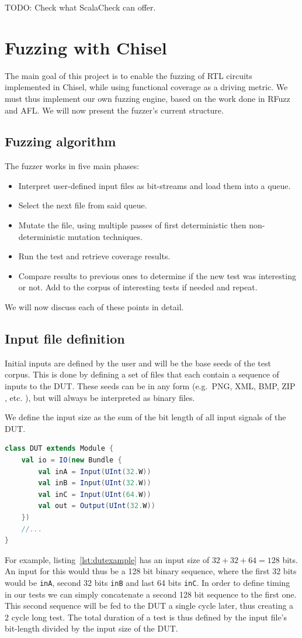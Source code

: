 \documentclass[conference]{IEEEtran}
\newcommand{\todo}[1]{{\color{olive} TODO: #1}}
\begin{document}
\todo{Check what ScalaCheck can offer.}


\section{Fuzzing with Chisel}
The main goal of this project is to enable the fuzzing of RTL circuits implemented in Chisel, while using functional coverage as a driving metric.
We must thus implement our own fuzzing engine, based on the work done in RFuzz and AFL. 
We will now present the fuzzer's current structure.

\subsection{Fuzzing algorithm}  
The fuzzer works in five main phases:  
\begin{itemize}
\item Interpret user-defined input files as bit-streams and load them into a queue.
\item Select the next file from said queue.
\item Mutate the file, using multiple passes of first deterministic then non-deterministic mutation techniques.  
\item Run the test and retrieve coverage results. 
\item Compare results to previous ones to determine if the new test was interesting or not. Add to the corpus of interesting tests if needed and repeat. 
\end{itemize}  

We will now discuss each of these points in detail.  
\subsection{Input file definition} 
Initial inputs are defined by the user and will be the base seeds of the test corpus.
This is done by defining a set of files that each contain a sequence of inputs to the DUT.
These seeds can be in any form (e.g.\ PNG, XML, BMP, ZIP , etc. ), but will always be interpreted as binary files.

We define the input size as the sum of the bit length of all input signals of the DUT.
\begin{lstlisting}[captionpos=b,caption={Basic DUT with two 32 bit inputs, one 64 input, as well as a 32 bit output.},label={lst:dutexample},language=scala]
class DUT extends Module {
    val io = IO(new Bundle {
        val inA = Input(UInt(32.W))
        val inB = Input(UInt(32.W))
        val inC = Input(UInt(64.W))
        val out = Output(UInt(32.W))
    })
    //...
}
\end{lstlisting}
For example, listing~\ref{lst:dutexample} has an input size of $32 + 32 + 64 = 128$ bits.
An input for this would thus be a 128 bit binary sequence, where the first 32 bits would be \texttt{inA}, second 32 bits \texttt{inB} and last 64 bits \texttt{inC}.
In order to define timing in our tests we can simply concatenate a second 128 bit sequence to the first one.
This second sequence will be fed to the DUT a single cycle later, thus creating a 2 cycle long test.
The total duration of a test is thus defined by the input file's bit-length divided by the input size of the DUT.
\end{document}
